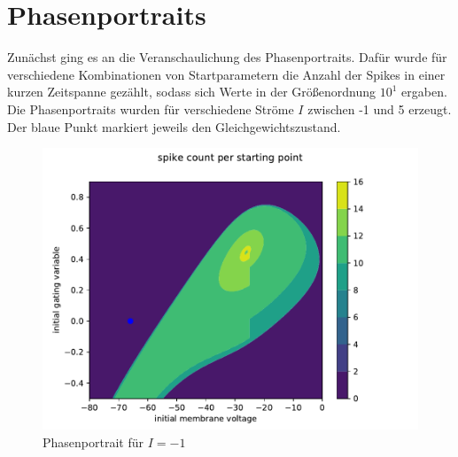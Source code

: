 \documentclass[12pt,a4paper]{article}
\begin{document}
\section{Phasenportraits}
Zunächst ging es an die Veranschaulichung des Phasenportraits. Dafür wurde für verschiedene Kombinationen von Startparametern die Anzahl der Spikes in einer kurzen Zeitspanne gezählt, sodass sich Werte in der Größenordnung $10^{1}$ ergaben.
\\
Die Phasenportraits wurden für verschiedene Ströme $I$ zwischen -1 und 5 erzeugt.
Der blaue Punkt markiert jeweils den Gleichgewichtszustand.
\begin{figure}[H]
	\centering
	\includegraphics[scale=0.9]{contourneu-1neu.pdf} 
	\caption{Phasenportrait für $I=-1$}
	\label{ppm1}
\end{figure}
\end{document}
